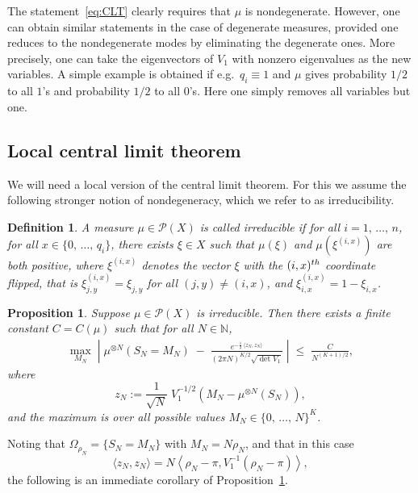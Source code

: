\documentclass[10pt,a4paper]{article}
\newtheorem{prop}[theorem]{Proposition}
\newtheorem{defi}[theorem]{Definition}
\renewcommand{\leq}{\;\leqslant\;}
\newcommand{\scalar}[2]{\langle #1, #2\rangle}
\newcommand{\cP}{\mathcal{P}}
\newcommand{\bbN}{\mathbb{N}}
\let\r=\rho
\let\O=\Omega
\begin{document}
The statement~\eqref{eq:CLT} clearly requires that $\mu$ is nondegenerate. However, one can obtain similar statements in the case of degenerate measures, provided one reduces to the nondegenerate modes by eliminating the degenerate ones. More precisely, one can take the eigenvectors of $V_1$ with nonzero eigenvalues as the new variables. A simple example is obtained if e.g.\ $q_i\equiv 1$ and $\mu$ gives probability $1/2$ to all $1$'s and probability $1/2$ to all $0$'s. Here one simply removes all variables but one.

\subsection{Local central limit theorem}

We will need a local version of the central limit theorem. For this we assume the following stronger notion of nondegeneracy, which we refer to as irreducibility.

\begin{defi}\label{def:irr}
A measure $\mu\in\cP(X)$ is called \emph{irreducible} if for all $i=1,\,\dots, \,n$, for all $x\in\{0,\,\dots,\,q_i\}$, there exists $\xi\in X$ such that $\mu(\xi)$ and $\mu(\xi^{(i,x)})$ are both positive, where $\xi^{(i,x)}$ denotes the vector $\xi$ with the $(i,x)^{\rm th}$ coordinate flipped, that is $\xi^{(i,x)}_{j,y}=\xi_{j,y}$ for all $(j,y)\neq (i,x)$, and $\xi^{(i,x)}_{i,x}=1-\xi_{i,x}$.
\end{defi}

\begin{prop}\label{prop:LCLT}
Suppose $\mu\in\cP(X)$ is irreducible. Then there exists a finite constant $C=C(\mu)$ such that for all $N\in\bbN$,
\begin{align}\label{eq:LCLT}
\max_{M_N}\;
\left |\;\mu^{\otimes N}\left(S_N=M_N\right) \;-\; \frac{e^{-\frac12\,\scalar{z_N}{z_N}}}{(2\pi N) ^{K/2}
\sqrt {\det V_1} }\;
\right| \leq \frac{C}{ N^{(K+1)/2}},
\end{align}
where
\[
z_N:=\frac1{\sqrt N} \;V_1^{-1/2}\left(M_N - \mu^{\otimes N}(S_N)\right),
\]
and the maximum is over all possible values $M_N\in\{0,\,\dots,\,N\}^K$.
\end{prop}
Noting that $\O_{\r_N}=\{S_N=M_N\}$ with $M_N=N\r_N$, and that in this case
\[
\scalar{z_N}{z_N}
= N \left\langle\r_N-\pi,V_1^{-1}(\r_N-\pi)\right\rangle,
\]
the following is an immediate corollary of Proposition~\ref{prop:LCLT}.
\end{document}
